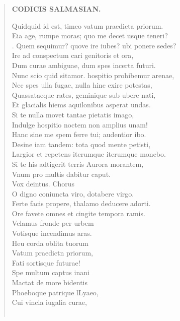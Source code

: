 \documentclass[11pt, a4paper]{report}
\begin{document}
\begin{verse}
    \begin{center} \textbf{CODICIS SALMASIAN.} \end{center} \marginpar{[65]} Quidquid id est, timeo vatum praedicta priorum. \\ Eia age, rumpe moras; quo me decet usque teneri? \\ . Quem sequimur? quove ire iubes? ubi ponere sedes? \\ Ire ad conspectum cari genitoris et ora, \\ Dum curae ambiguae, dum spes incerta futuri. \\ Nunc scio quid sitamor. hospitio prohibemur arenae, \\ Nec spes ulla fugae, nulla hinc exire potestas, \\ Quassataeque rates, geminique sub ubere nati, \\ Et glacialis hiems aquilonibus asperat undas. \\ Si te nulla movet tantae pietatis imago, \\ Indulge hospitio noctem non amplius unam! \\ Hanc sine me spem ferre tui; audentior ibo. \\ Desine iam tandem: tota quod mente petisti, \\ Largior et repetens iterumque iterumque monebo. \\ Si te his adtigerit terris Aurora morantem, \\ Vnum pro multis dabitur caput. \\ Vox deintus. Chorus \\ O digno coniuncta viro, dotabere virgo. \\ Ferte facis propere, thalamo deducere adorti. \\ Ore favete omnes et cingite tempora ramis. \\ Velamus fronde per urbem \\ Votisque incendimus aras. \\ Heu corda oblita tuorum \\ Vatum praedictn priorum, \\ Fati sortisque futurae! \\ Spe multum captus inani \\ Mactat de more bidentis \\ Phoeboque patrique lLyaeo, \\ Cui vincla iugalia curae, \\ 
        ﻿\pagebreak 

\end{verse}
\end{document}
